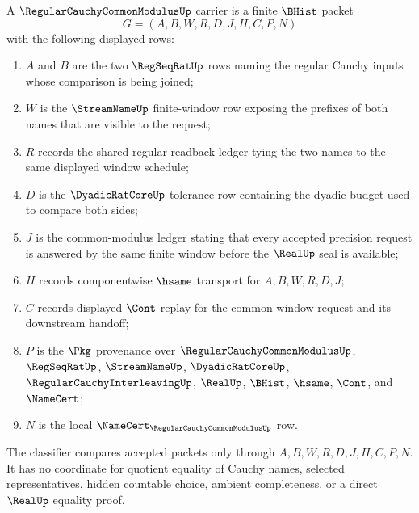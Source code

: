 \begin{definition}
\label{def:regular-cauchy-common-modulus-carrier}
A $\RegularCauchyCommonModulusUp$ carrier is a finite $\BHist$ packet
$$
G=(A,B,W,R,D,J,H,C,P,N)
$$
with the following displayed rows:
\begin{enumerate}
\item $A$ and $B$ are the two $\RegSeqRatUp$ rows naming the regular Cauchy inputs whose comparison is being joined;
\item $W$ is the $\StreamNameUp$ finite-window row exposing the prefixes of both names that are visible to the request;
\item $R$ records the shared regular-readback ledger tying the two names to the same displayed window schedule;
\item $D$ is the $\DyadicRatCoreUp$ tolerance row containing the dyadic budget used to compare both sides;
\item $J$ is the common-modulus ledger stating that every accepted precision request is answered by the same finite window before the $\RealUp$ seal is available;
\item $H$ records componentwise $\hsame$ transport for $A,B,W,R,D,J$;
\item $C$ records displayed $\Cont$ replay for the common-window request and its downstream handoff;
\item $P$ is the $\Pkg$ provenance over $\RegularCauchyCommonModulusUp$, $\RegSeqRatUp$, $\StreamNameUp$, $\DyadicRatCoreUp$, $\RegularCauchyInterleavingUp$, $\RealUp$, $\BHist$, $\hsame$, $\Cont$, and $\NameCert$;
\item $N$ is the local $\NameCert_{\RegularCauchyCommonModulusUp}$ row.
\end{enumerate}
The classifier compares accepted packets only through $A,B,W,R,D,J,H,C,P,N$. It has no coordinate for quotient equality of Cauchy names, selected representatives, hidden countable choice, ambient completeness, or a direct $\RealUp$ equality proof.
\end{definition}

